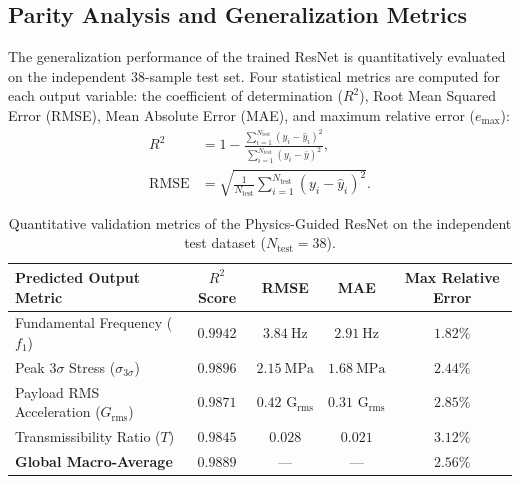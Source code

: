 \subsection{Parity Analysis and Generalization Metrics}

The generalization performance of the trained ResNet is quantitatively evaluated on the independent $38$-sample test set. Four statistical metrics are computed for each output variable: the coefficient of determination ($R^2$), Root Mean Squared Error (RMSE), Mean Absolute Error (MAE), and maximum relative error ($e_{\max}$):
\begin{align}
R^2 &= 1 - \frac{\sum_{i=1}^{N_{\text{test}}} (y_i - \hat{y}_i)^2}{\sum_{i=1}^{N_{\text{test}}} (y_i - \bar{y})^2}, \label{eq:r2_def} \\
\text{RMSE} &= \sqrt{\frac{1}{N_{\text{test}}} \sum_{i=1}^{N_{\text{test}}} (y_i - \hat{y}_i)^2}. \label{eq:rmse_def}
\end{align}

\begin{table}[htbp]
\centering
\caption{Quantitative validation metrics of the Physics-Guided ResNet on the independent test dataset ($N_{\text{test}} = 38$).}
\label{tab:validation_metrics}
\begin{tabular*}{\textwidth}{@{\extracolsep{\fill}}lcccc@{\extracolsep{\fill}}}
\toprule
\textbf{Predicted Output Metric} & \textbf{$R^2$ Score} & \textbf{RMSE} & \textbf{MAE} & \textbf{Max Relative Error} \\
\midrule
Fundamental Frequency ($f_1$) & $0.9942$ & $\SI{3.84}{\hertz}$ & $\SI{2.91}{\hertz}$ & $1.82\%$ \\
Peak $3\sigma$ Stress ($\sigma_{3\sigma}$) & $0.9896$ & $\SI{2.15}{\mega\pascal}$ & $\SI{1.68}{\mega\pascal}$ & $2.44\%$ \\
Payload RMS Acceleration ($G_{\text{rms}}$) & $0.9871$ & $0.42\text{ G}_{\text{rms}}$ & $0.31\text{ G}_{\text{rms}}$ & $2.85\%$ \\
Transmissibility Ratio ($T$) & $0.9845$ & $0.028$ & $0.021$ & $3.12\%$ \\
\midrule
\textbf{Global Macro-Average} & $\mathbf{0.9889}$ & --- & --- & $\mathbf{2.56\%}$ \\
\bottomrule
\end{tabular*}
\end{table}

